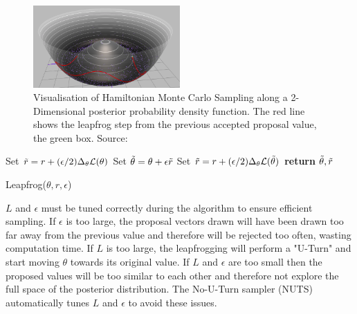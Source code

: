 \documentclass[ %
                    author={Tom Jager},
                supervisor={Dr. Daniel Schien},
                    degree={MEng},
                     title={A Bayesian Inference Engine for Calibrating Uncertainty over UMIS Structured MFA Systems},
                  subtitle={},
                      type={research},
                      year={2019} ]{dissertation}
\begin{document}
\begin{figure}[]
\centering
\includegraphics[width=0.5\textwidth]{images/hamiltonian_mcmc.png}
\caption{Visualisation of Hamiltonian Monte Carlo Sampling along a 2-Dimensional posterior probability density function. The red line shows the leapfrog step from the previous accepted proposal value, the green box. Source: \cite{rogozhnikov_2016}}
\label{fig:umis_aspects}
\end{figure}

\begin{algorithm}[h!]
Set $\Tilde{r} = r + (\epsilon/2)\Delta_\theta\mathcal{L}(\theta)$\;
Set $\Tilde{\theta} = \theta + \epsilon \Tilde{r}$\;
Set $\Tilde{r} = r + (\epsilon/2)\Delta_\theta\mathcal{L}(\Tilde{\theta})$\;
\textbf{return} $\Tilde{\theta}, \Tilde{r}$\;
\caption{Leapfrog($\theta, r, \epsilon$)} 
    \label{alg:leapfrog}
\end{algorithm}

$L$ and $\epsilon$ must be tuned correctly during the algorithm to ensure efficient sampling. If $\epsilon$ is too large, the proposal vectors drawn will have been drawn too far away from the previous value and therefore will be rejected too often, wasting computation time. If $L$ is too large, the leapfrogging will perform a "U-Turn" and start moving $\theta$ towards its original value. If $L$ and $\epsilon$ are too small then the proposed values will be too similar to each other and therefore not explore the full space of the posterior distribution. The No-U-Turn sampler (NUTS) \cite{hoffman2014no} automatically tunes $L$ and $\epsilon$ to avoid these issues.
\end{document}
